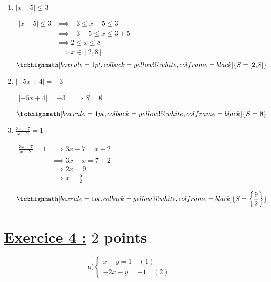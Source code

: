 \documentclass[12pt,a4paper]{article}
\begin{document}
\begin{enumerate}
\begin{enumerate}
Comme \( -\frac{7}{6} \notin D_v = [5, +\infty[ \) et \( \frac{3}{8} \in D_v = [5, +\infty[ \)

\[
\tcbhighmath[boxrule=1pt, colback=yellow!5!white, colframe=black]{S =
\left\{\frac{3}{8}\right\}
}
\]

\item \( |x - 5| \leq 3 \)

\( 
\begin{aligned}
    |x - 5| \leq 3 &\implies -3 \leq x - 5 \leq 3\\
                   &\implies -3+5 \leq x \leq 3+5\\
                    &\implies 2 \leq x \leq 8\\
                    &\implies x\in[2,8]
\end{aligned}
\)
\[
\tcbhighmath[boxrule=1pt, colback=yellow!5!white, colframe=black]{ S = [2,8] }
\]

\item \( |-5x+4 |= - 3 \)

\( 
\begin{aligned}
    |-5x+4 |= - 3 &\implies S=\emptyset \\
\end{aligned}
\)
\[
\tcbhighmath[boxrule=1pt, colback=yellow!5!white, colframe=black]{ S=\emptyset }
\]

\item \( \frac{3x-7}{x+2}=1 \)

\(
\begin{aligned}
    \frac{3x-7}{x+2}=1 &\implies 3x-7 = x+2\\
                        &\implies 3x-x = 7+2\\
                        &\implies 2x = 9\\
                        &\implies x = \frac{9}{2}
\end{aligned}
\)

\[
\tcbhighmath[boxrule=1pt, colback=yellow!5!white, colframe=black]{ S = \left\lbrace  \frac{9}{2} \right\rbrace  } 
\]
    \end{enumerate}

\end{enumerate}
\newpage
\section*{\underline{Exercice 4 :} $2$ points}
\[
\text{a)} 
\begin{cases}
x - y = 1 \quad (1) \\
-2x - y = -1 \quad (2)
\end{cases}
\]
\end{document}
